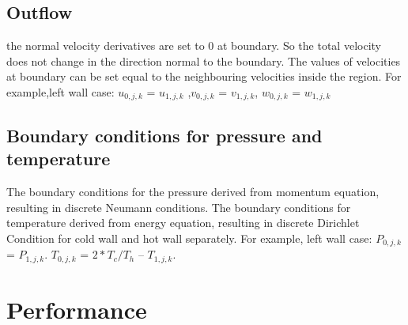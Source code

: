 \documentclass{article}%
\begin{document}
\subsection{Outflow}
the normal velocity derivatives are set to 0 at boundary. So the total velocity does not change in the direction normal to the boundary. The values of velocities at boundary can be set equal to the neighbouring velocities inside the region. For example,left wall case: $u_{0,j,k}$ = $u_{1,j,k}$ ,$v_{0,j,k}$ = $v_{1,j,k}$, $w_{0,j,k}$ = $w_{1,j,k}$
\subsection{Boundary conditions for pressure and temperature}
The boundary conditions for the pressure derived from momentum equation, resulting in discrete Neumann conditions. The boundary conditions for temperature derived from energy equation, resulting in discrete Dirichlet Condition for cold wall and hot wall separately. For example, left wall case: $P_{0,j,k}$ = $P_{1,j,k}$.  $T_{0,j,k}$ = $2*T_c/T_h$ – $T_{1,j,k}$.

\section{Performance}
\end{document}
